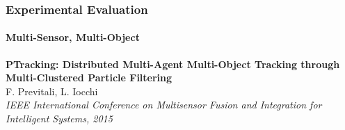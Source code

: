 \begin{frame}
	\frametitle{Experimental Evaluation}
	\framesubtitle{Multi-Sensor, Multi-Object}
	
	\vspace{-0.2cm}
	
	\begin{center}
	\end{center}
	
	\tiny
	
	\vspace{-0.75cm}
	
	\begin{tabbing}
		\hspace{1.05cm}
		\textbf{PTracking: Distributed Multi-Agent Multi-Object Tracking through Multi-Clustered
				Particle Filtering} \\
		\hspace{1.05cm}
		F. Previtali, L. Iocchi \\
		\hspace{1.05cm}
		\emph{IEEE International Conference on Multisensor Fusion and Integration for Intelligent
		Systems, 2015} \\
	\end{tabbing}
	
	\vspace{-0.8cm}
	
	\begin{center}
		\hspace{-6.85cm}
	\end{center}
	

\end{frame}
